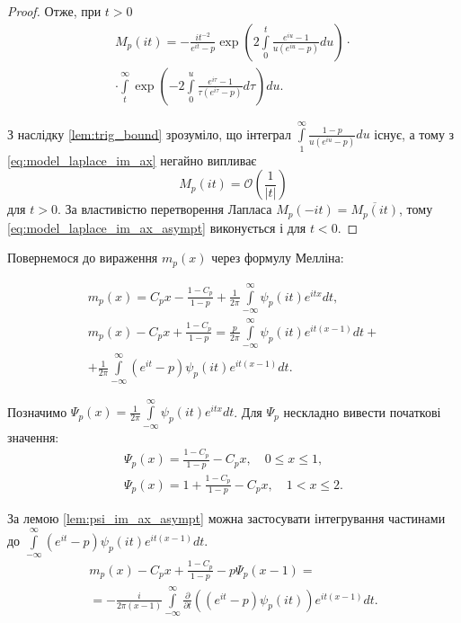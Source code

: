 \begin{lem}
\begin{proof}
Отже, при $t>0$
\begin{equation}
\label{eq:model_laplace_im_ax}
\begin{gathered}
M_{p}(it) = -\frac{i t^{-2}}{e^{it}-p} \exp \left(2 \int\limits_{0}^{t} \frac{e^{iu} -1}{u(e^{iu} - p)} du\right) \cdot \\
\cdot \int\limits_t^\infty \exp\left(-2 \int\limits_{0}^{u} \frac{e^{i\tau} -1}{\tau(e^{i\tau} - p)} d\tau\right) du.
\end{gathered}
\end{equation}

З наслідку \eqref{lem:trig_bound} зрозуміло, що інтеграл $\int\limits_{1}^{\infty} \frac{1-p}{u(e^{iu} - p)} du$ існує, а тому з \eqref{eq:model_laplace_im_ax} негайно випливає
\begin{equation}
\label{eq:model_laplace_im_ax_asympt}
M_{p}(it) = \mathcal{O}\left(\frac{1}{|t|}\right)
\end{equation}
для $t > 0$. За властивістю перетворення Лапласа $M_{p}(-it) = \overline{M_{p}(it)}$, тому \eqref{eq:model_laplace_im_ax_asympt} виконується і для $t < 0$.
\end{proof}
\end{lem}

Повернемося до вираження $m_{p}(x)$ через формулу Мелліна:

\begin{gather*}
m_{p}(x) = C_{p} x - \frac{1 - C_p}{1-p} + \frac{1}{2\pi} \int\limits_{-\infty}^{\infty} \psi_{p}(it) e^{itx} dt, \\
m_{p}(x) - C_{p} x + \frac{1 - C_p}{1-p} = \frac{p}{2\pi} \int\limits_{-\infty}^{\infty} \psi_{p}(it) e^{it(x-1)} dt + \\
+ \frac{1}{2\pi} \int\limits_{-\infty}^{\infty} (e^{it} - p) \psi_{p}(it) e^{it(x-1)} dt.
\end{gather*}

Позначимо $\Psi_{p}(x) = \frac{1}{2\pi} \int\limits_{-\infty}^{\infty} \psi_{p}(it) e^{itx} dt$. Для $\Psi_{p}$ нескладно вивести початкові значення:
\begin{equation}
\label{eq:psi_x_initial_values}
\begin{gathered}
\Psi_{p}(x) = \frac{1 - C_p}{1-p} - C_{p} x, \quad 0 \leq x \leq 1, \\
\Psi_{p}(x) = 1 + \frac{1 - C_p}{1-p} - C_{p} x, \quad 1 < x \leq 2.
\end{gathered}
\end{equation}

За лемою \eqref{lem:psi_im_ax_asympt} можна застосувати інтегрування частинами до $\int\limits_{-\infty}^{\infty} (e^{it} - p) \psi_{p}(it) e^{it(x-1)} dt$.
\begin{gather*}
m_{p}(x) - C_{p} x + \frac{1 - C_p}{1-p} - p\Psi_{p}(x-1) = \\
= -\frac{i}{2\pi (x-1)} \int\limits_{-\infty}^{\infty} \frac{\partial}{\partial t}((e^{it} - p) \psi_{p}(it)) e^{it(x-1)} dt.
\end{gather*}

